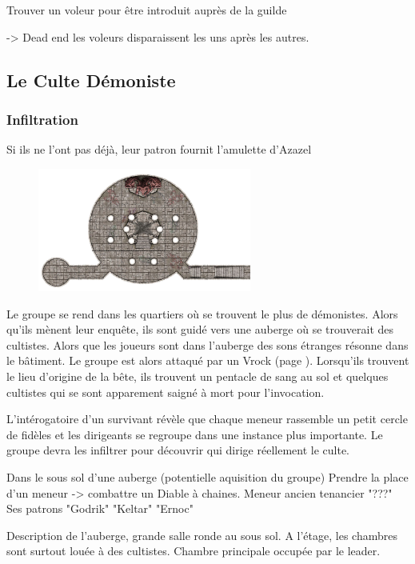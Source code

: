 Trouver un voleur pour être introduit auprès de la guilde

-> Dead end les voleurs disparaissent les uns après les autres.

\subsection*{Le Culte Démoniste}

\subsubsection*{Infiltration}
Si ils ne l'ont pas déjà, leur patron fournit l'amulette d'Azazel

\begin{figure}[htb!]
\center
\includegraphics[width=7cm]{Maps/Temple.png}
\end{figure}

Le groupe se rend dans les quartiers où se trouvent le plus de démonistes. 
Alors qu'ils mènent leur enquête, ils sont guidé vers une auberge où se 
trouverait des cultistes. Alors que les joueurs sont dans l'auberge des sons 
étranges résonne dans le bâtiment. Le groupe est alors attaqué par un Vrock
(page \pageref{Vrock}). Lorsqu'ils trouvent le lieu d'origine de la bête, ils trouvent un 
pentacle de sang au sol et quelques cultistes qui se sont apparement saigné 
à mort pour l'invocation.

L'intérogatoire d'un survivant révèle que chaque meneur rassemble un petit 
cercle de fidèles et les dirigeants se regroupe dans une instance plus 
importante. Le groupe devra les infiltrer pour découvrir qui dirige réellement
le culte.

Dans le sous sol d'une auberge (potentielle aquisition du groupe)
Prendre la place d'un meneur -> combattre un Diable à chaines.
Meneur ancien tenancier "???"
Ses patrons "Godrik" "Keltar" "Ernoc"

Description de l'auberge, grande salle ronde au sous sol. A l'étage, les 
chambres sont surtout louée à des cultistes. Chambre principale occupée par le leader.

